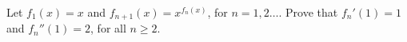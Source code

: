 Let $f_1(x) = x$ and $f_{n+1}(x) = x^{f_n(x)}$, for $n = 1, 2 \dots$. Prove
that $f_n'(1) = 1$ and $f_n''(1) = 2$, for all $n \ge 2$.
